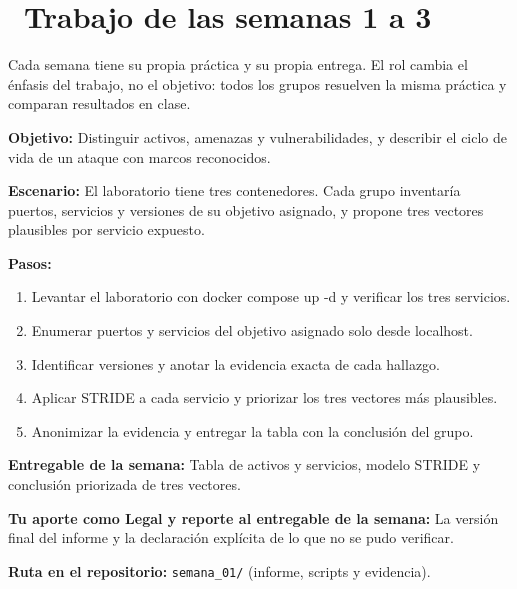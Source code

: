 \documentclass[11pt,a4paper]{article}
\newcommand{\iconotexto}[2]{\textcolor{cyanNeon}{\faIcon{#1}}~#2}
\begin{document}
\section{\iconotexto{calendar-alt}{Trabajo de las semanas 1 a 3}}

Cada semana tiene su propia práctica y su propia entrega. El rol cambia el énfasis del trabajo, no el objetivo: todos los grupos resuelven la misma práctica y comparan resultados en clase.

\begin{tcolorbox}[cajaContenido,title={Semana 1 --- Inventario de superficie de ataque del laboratorio}]
\textbf{Objetivo:} Distinguir activos, amenazas y vulnerabilidades, y describir el ciclo de vida de un ataque con marcos reconocidos.

\textbf{Escenario:} El laboratorio tiene tres contenedores. Cada grupo inventaría puertos, servicios y versiones de su objetivo asignado, y propone tres vectores plausibles por servicio expuesto.


\textbf{Pasos:}
\begin{enumerate}[leftmargin=1.4em,itemsep=2pt,topsep=3pt]
  \item Levantar el laboratorio con docker compose up -d y verificar los tres servicios.
  \item Enumerar puertos y servicios del objetivo asignado solo desde localhost.
  \item Identificar versiones y anotar la evidencia exacta de cada hallazgo.
  \item Aplicar STRIDE a cada servicio y priorizar los tres vectores más plausibles.
  \item Anonimizar la evidencia y entregar la tabla con la conclusión del grupo.
\end{enumerate}
\textbf{Entregable de la semana:} Tabla de activos y servicios, modelo STRIDE y conclusión priorizada de tres vectores.

\textbf{Tu aporte como Legal y reporte al entregable de la semana:} La versión final del informe y la declaración explícita de lo que no se pudo verificar.

\textbf{Ruta en el repositorio:} \texttt{semana\_01/} (informe, scripts y evidencia).
\end{tcolorbox}
\end{document}
